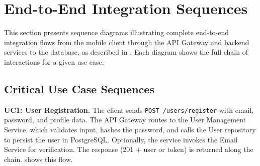 \section{End-to-End Integration Sequences}
\label{sec:end_to_end_integration_sequences}%

This section presents sequence diagrams illustrating complete end-to-end integration flows from the mobile client through the API Gateway and backend services to the database, as described in . Each diagram shows the full chain of interactions for a given use case.

\subsection{Critical Use Case Sequences}
\label{subsec:critical_use_case_sequences}%

\textbf{UC1: User Registration.} The client sends \texttt{POST /users/register} with email, password, and profile data. The API Gateway routes to the User Management Service, which validates input, hashes the password, and calls the User repository to persist the user in PostgreSQL. Optionally, the service invokes the Email Service for verification. The response (201 + user or token) is returned along the chain.  shows this flow.

